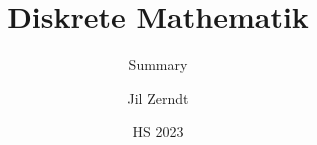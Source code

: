 \documentclass[a4paper, fontsize = 8pt, landscape]{scrartcl}
\title{Diskrete Mathematik}
\subtitle{Summary}
\author{Jil Zerndt}
\date{HS 2023}
\begin{document}
\begin{multicols}{2}
	\thispagestyle{TitlePageStyle}
	\maketitleinfo
	\sffamily
	
	\raggedcolumns
	\pagebreak
	
	\raggedcolumns
	\pagebreak
	
	\raggedcolumns
	\pagebreak
	
	\raggedcolumns
	\pagebreak
	
	\raggedcolumns
	\pagebreak
	
	\raggedcolumns
\end{multicols}
\end{document}
